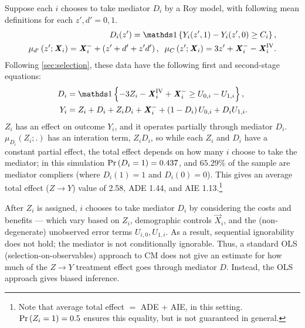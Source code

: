 Suppose each $i$ chooses to take mediator $D_i$ by a Roy model, with following mean definitions for each $z', d' = 0, 1$.
\begin{align*}
    D_i(z') = \indicator{Y_i(z', 1) - Y_i(z', 0) \geq C_i},  \\
    \mu_{d'}\left(z' ; \vec X_i \right) = \vec X_i^- + \left( z' + d' + z' d' \right),
    \;\; \mu_{C}\left(z' ; \vec X_i \right) = 3z' + \vec X_i^- - \vec X_i^{\text{IV}}.
\end{align*}
Following \autoref{sec:selection}, these data have the following first and second-stage equations:
\begin{align*}
    D_i &= \indicator{-3Z_i - \vec X_i^{\text{IV}} + \vec X_i^- \geq U_{0,i} - U_{1,i}},  \\
    Y_i &= Z_i + D_i + Z_i D_i + \vec X_i^-
        + \left( 1 - D_i \right) U_{0,i} + D_i U_{1,i}.
\end{align*}
$Z_i$ has an effect on outcome $Y_i$, and it operates partially through mediator $D_i$.
$\mu_{D_i}(Z_i;.)$ has an interation term, $Z_i D_i$, so while each $Z_i$ and $D_i$ have a constant partial effect, the total effect depends on how many $i$ choose to take the mediator; in this simulation $\Pr\left( D_i = 1 \right) = 0.437$, and $65.29\%$ of the sample are mediator compliers (where $D_i(1)=1$ and $D_i(0) = 0$).
This gives an average total effect ($Z\to Y$) value of 2.58, ADE 1.44, and AIE 1.13.\footnote{
    Note that average total effect $=$ ADE $+$ AIE, in this setting.
    $\Pr\left( Z_i=1 \right) = 0.5$ ensures this equality, but is not guaranteed in general.
}

After $Z_i$ is assigned, $i$ chooses to take mediator $D_i$ by considering the costs and benefits --- which vary based on $Z_i$, demographic controls $\vec X_i$, and the (non-degenerate) unobserved error terms $U_{i,0}, U_{1,i}$.
As a result, sequential ignorability does not hold; the mediator is not conditionally ignorable.
Thus, a standard OLS (selection-on-observables) approach to CM does not give an estimate for how much of the $Z \to Y$ treatment effect goes through mediator $D$.
Instead, the OLS approach gives biased inference.

